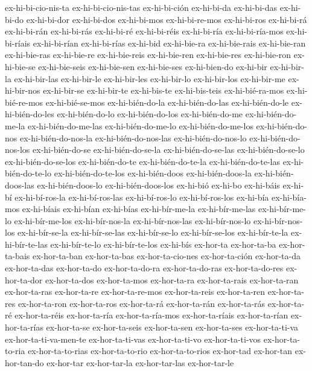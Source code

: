 {ex-hi-bi-cio-nis-ta
ex-hi-bi-cio-nis-tas
ex-hi-bi-ción
ex-hi-bi-da
ex-hi-bi-das
ex-hi-bi-do
ex-hi-bi-dor
ex-hi-bi-dos
ex-hi-bi-mos
ex-hi-bi-re-mos
ex-hi-bi-ros
ex-hi-bi-rá
ex-hi-bi-rán
ex-hi-bi-rás
ex-hi-bi-ré
ex-hi-bi-réis
ex-hi-bi-ría
ex-hi-bi-ría-mos
ex-hi-bi-ríais
ex-hi-bi-rían
ex-hi-bi-rías
ex-hi-bid
ex-hi-bie-ra
ex-hi-bie-rais
ex-hi-bie-ran
ex-hi-bie-ras
ex-hi-bie-re
ex-hi-bie-reis
ex-hi-bie-ren
ex-hi-bie-res
ex-hi-bie-ron
ex-hi-bie-se
ex-hi-bie-seis
ex-hi-bie-sen
ex-hi-bie-ses
ex-hi-bien-do
ex-hi-bir
ex-hi-bir-la
ex-hi-bir-las
ex-hi-bir-le
ex-hi-bir-les
ex-hi-bir-lo
ex-hi-bir-los
ex-hi-bir-me
ex-hi-bir-nos
ex-hi-bir-se
ex-hi-bir-te
ex-hi-bis-te
ex-hi-bis-teis
ex-hi-bié-ra-mos
ex-hi-bié-re-mos
ex-hi-bié-se-mos
ex-hi-bién-do-la
ex-hi-bién-do-las
ex-hi-bién-do-le
ex-hi-bién-do-les
ex-hi-bién-do-lo
ex-hi-bién-do-los
ex-hi-bién-do-me
ex-hi-bién-do-me-la
ex-hi-bién-do-me-las
ex-hi-bién-do-me-lo
ex-hi-bién-do-me-los
ex-hi-bién-do-nos
ex-hi-bién-do-nos-la
ex-hi-bién-do-nos-las
ex-hi-bién-do-nos-lo
ex-hi-bién-do-nos-los
ex-hi-bién-do-se
ex-hi-bién-do-se-la
ex-hi-bién-do-se-las
ex-hi-bién-do-se-lo
ex-hi-bién-do-se-los
ex-hi-bién-do-te
ex-hi-bién-do-te-la
ex-hi-bién-do-te-las
ex-hi-bién-do-te-lo
ex-hi-bién-do-te-los
ex-hi-bién-doos
ex-hi-bién-doos-la
ex-hi-bién-doos-las
ex-hi-bién-doos-lo
ex-hi-bién-doos-los
ex-hi-bió
ex-hi-bo
ex-hi-báis
ex-hi-bí
ex-hi-bí-ros-la
ex-hi-bí-ros-las
ex-hi-bí-ros-lo
ex-hi-bí-ros-los
ex-hi-bía
ex-hi-bía-mos
ex-hi-bíais
ex-hi-bían
ex-hi-bías
ex-hi-bír-me-la
ex-hi-bír-me-las
ex-hi-bír-me-lo
ex-hi-bír-me-los
ex-hi-bír-nos-la
ex-hi-bír-nos-las
ex-hi-bír-nos-lo
ex-hi-bír-nos-los
ex-hi-bír-se-la
ex-hi-bír-se-las
ex-hi-bír-se-lo
ex-hi-bír-se-los
ex-hi-bír-te-la
ex-hi-bír-te-las
ex-hi-bír-te-lo
ex-hi-bír-te-los
ex-hi-bís
ex-hor-ta
ex-hor-ta-ba
ex-hor-ta-bais
ex-hor-ta-ban
ex-hor-ta-bas
ex-hor-ta-cio-nes
ex-hor-ta-ción
ex-hor-ta-da
ex-hor-ta-das
ex-hor-ta-do
ex-hor-ta-do-ra
ex-hor-ta-do-ras
ex-hor-ta-do-res
ex-hor-ta-dor
ex-hor-ta-dos
ex-hor-ta-mos
ex-hor-ta-ra
ex-hor-ta-rais
ex-hor-ta-ran
ex-hor-ta-ras
ex-hor-ta-re
ex-hor-ta-re-mos
ex-hor-ta-reis
ex-hor-ta-ren
ex-hor-ta-res
ex-hor-ta-ron
ex-hor-ta-ros
ex-hor-ta-rá
ex-hor-ta-rán
ex-hor-ta-rás
ex-hor-ta-ré
ex-hor-ta-réis
ex-hor-ta-ría
ex-hor-ta-ría-mos
ex-hor-ta-ríais
ex-hor-ta-rían
ex-hor-ta-rías
ex-hor-ta-se
ex-hor-ta-seis
ex-hor-ta-sen
ex-hor-ta-ses
ex-hor-ta-ti-va
ex-hor-ta-ti-va-men-te
ex-hor-ta-ti-vas
ex-hor-ta-ti-vo
ex-hor-ta-ti-vos
ex-hor-ta-to-ria
ex-hor-ta-to-rias
ex-hor-ta-to-rio
ex-hor-ta-to-rios
ex-hor-tad
ex-hor-tan
ex-hor-tan-do
ex-hor-tar
ex-hor-tar-la
ex-hor-tar-las
ex-hor-tar-le
}
